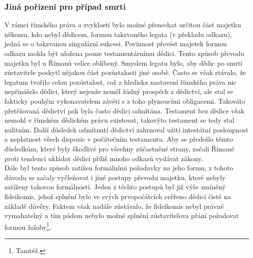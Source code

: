 \documentclass{article}
\begin{document}

\subsubsection{Jiná pořízení pro případ smrti}

V rámci římského práva a zvyklostí bylo možné přenechat určitou část majetku někomu, kdo nebyl dědicem, formou takzvaného legata (v překladu odkazu), jedná se o takzvanou singulární sukcesi. Povinnost převést majetek formou odkazu mohla být uložena pouze testamentárnímu dědici. Tento způsob převodu majetku byl u Římanů velice oblíbený. Smyslem legatu bylo, aby dědic po smrti zůstavitele poskytl nějakou část pozůstalosti jiné osobě. Často se však stávalo, že legatum tvořilo celou pozůstalost, což z hlediska nastavení římského práva nic nepřinášelo dědici, který nejenže neměl žádný prospěch z dědictví, ale stal se fakticky pouhým vykonavatelem závěti s z toho plynoucími obligacemi. Takováto přetěžovaná dědictví pak byla často dědici odmítána. Testament bez dědice však nemohl v římském dědickém právu existovat, takovýto testament se tedy stal nulitním. Další důsledek odmítnutí dědictví zahrnoval užití intestátní posloupnost a neplatnost všech dispozic v počátečním testamentu. Aby se předešlo těmto důsledkům, které byly škodlivé pro všechny zúčastněné strany, začali Římané proti tendenci ukládat dědici příliš mnoho odkazů vydávat zákony.\\


Dále byl tento způsob zatížen formálními požadavky na jeho formu, z tohoto důvodu se začaly vyčleňovat i jiné postupy převodu majetku, které nebyly zatíženy takovou formálností. Jeden z těchto postupů byl již výše zmíněný fideikomis, jehož splnění bylo ve svých prvopočátcích svěřeno dědici čistě na základě důvěry. Faktem však nadále zůstávalo, že fideikomis nebyl právně vymahatelný a tím pádem nebylo možné splnění zůstavitelova přání požadovat formou žaloby\footnote{Tamtéž.}.\\
\end{document}
